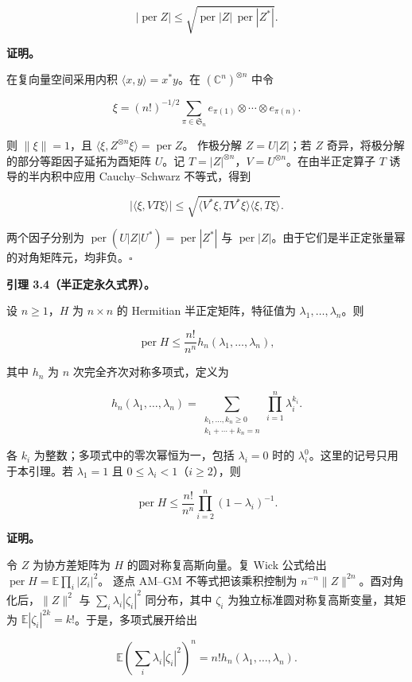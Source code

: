 \documentclass[11pt,a4paper]{article}
\begin{document}
\[
|\operatorname{per}Z|
\le\sqrt{\operatorname{per}|Z|\,
\operatorname{per}|Z^*|}.
\]

\textbf{证明。}

在复向量空间采用内积 \(\langle x,y\rangle=x^*y\)。在 \((\mathbb C^n)^{\otimes n}\) 中令

\[
\xi=(n!)^{-1/2}
\sum_{\pi\in \mathfrak S_n}
e_{\pi(1)}\otimes\cdots\otimes e_{\pi(n)}.
\]

则 \(\|\xi\|=1\)，且 \(\langle\xi,Z^{\otimes n}\xi\rangle=\operatorname{per}Z\)。 作极分解 \(Z=U|Z|\)；若 \(Z\) 奇异，将极分解的部分等距因子延拓为酉矩阵 \(U\)。记 \(T=|Z|^{\otimes n}\)，\(V=U^{\otimes n}\)。在由半正定算子 \(T\) 诱导的半内积中应用 Cauchy--Schwarz 不等式，得到

\[
|\langle\xi,VT\xi\rangle|
\le\sqrt{\langle V^*\xi,TV^*\xi\rangle
\langle\xi,T\xi\rangle}.
\]

两个因子分别为 \(\operatorname{per}(U|Z|U^*)=\operatorname{per}|Z^*|\) 与 \(\operatorname{per}|Z|\)。由于它们是半正定张量幂的对角矩阵元，均非负。\(\square\)

\textbf{引理 3.4（半正定永久式界）。}

设 \(n\ge1\)，\(H\) 为 \(n\times n\) 的 Hermitian 半正定矩阵，特征值为 \(\lambda_1,\ldots,\lambda_n\)。则

\[
\operatorname{per}H\le\frac{n!}{n^n}h_n(\lambda_1,\ldots,\lambda_n),
\]

其中 \(h_n\) 为 \(n\) 次完全齐次对称多项式，定义为

\[
h_n(\lambda_1,\ldots,\lambda_n)
=\sum_{\substack{k_1,\ldots,k_n\ge0\\k_1+\cdots+k_n=n}}
\prod_{i=1}^n\lambda_i^{k_i}.
\]

各 \(k_i\) 为整数；多项式中的零次幂恒为一，包括 \(\lambda_i=0\) 时的 \(\lambda_i^0\)。这里的记号只用于本引理。若 \(\lambda_1=1\) 且 \(0\le\lambda_i<1\)（\(i\ge2\)），则

\[
\operatorname{per}H\le\frac{n!}{n^n}
\prod_{i=2}^n(1-\lambda_i)^{-1}.
\]

\textbf{证明。}

令 \(Z\) 为协方差矩阵为 \(H\) 的圆对称复高斯向量。复 Wick 公式给出 \(\operatorname{per}H=\mathbb E\prod_i|Z_i|^2\)。 逐点 AM--GM 不等式把该乘积控制为 \(n^{-n}\|Z\|^{2n}\)。酉对角化后，\(\|Z\|^2\) 与 \(\sum_i\lambda_i|\zeta_i|^2\) 同分布，其中 \(\zeta_i\) 为独立标准圆对称复高斯变量，其矩为 \(\mathbb E|\zeta_i|^{2k}=k!\)。于是，多项式展开给出

\[
\mathbb E\left(\sum_i\lambda_i|\zeta_i|^2\right)^n
=n!h_n(\lambda_1,\ldots,\lambda_n).
\]
\end{document}
